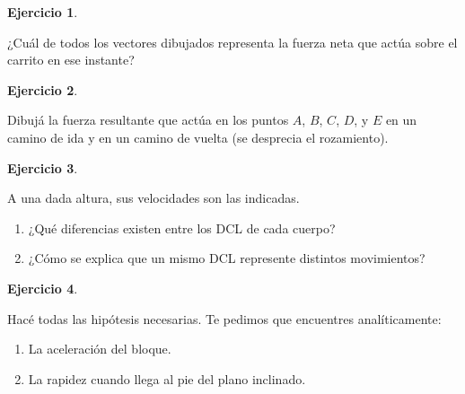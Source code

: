 \documentclass[a4paper,12pt,twoside]{book}
\newtheorem{ejercicio}{{Ejercicio}}[chapter]
\begin{document}
\begin{mdframed}[style=ejercicio-facil]
    \begin{ejercicio}
    \end{ejercicio}
    ¿Cuál de todos los vectores dibujados representa la fuerza neta que actúa sobre el carrito en ese instante?
    \begin{center}
        \def\svgwidth{0.6\linewidth}
        
    \end{center}
\end{mdframed}

\begin{mdframed}[style=ejercicio-intermedio]
    \begin{ejercicio}
    \end{ejercicio}
    Dibujá la fuerza resultante que actúa en los puntos $A$, $B$, $C$, $D$, y $E$ en un camino de ida y en un camino de vuelta (se desprecia el rozamiento).
    \begin{center}
        \def\svgwidth{0.6\linewidth}
        
    \end{center}
\end{mdframed}

\begin{mdframed}[style=ejercicio-intermedio]
    \begin{ejercicio}
    \end{ejercicio}
    A una dada altura, sus velocidades son las indicadas.
    \begin{center}
        \def\svgwidth{0.8\linewidth}
        
    \end{center}
    \begin{enumerate}
        \item ¿Qué diferencias existen entre los DCL de cada cuerpo? 
        \item ¿Cómo se explica que un mismo DCL represente distintos movimientos?  
    \end{enumerate}
\end{mdframed}

\begin{mdframed}[style=ejercicio-intermedio]
    \begin{ejercicio}
    \end{ejercicio}
    Hacé todas las hipótesis necesarias.
    Te pedimos que encuentres analíticamente:
    \begin{enumerate}
        \item La aceleración del bloque.
        \item La rapidez cuando llega al pie del plano inclinado.
    \end{enumerate}
\end{mdframed}
\end{document}
